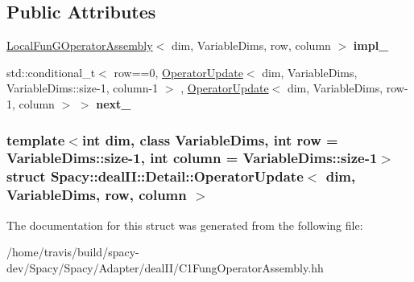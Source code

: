 \subsection*{\-Public \-Attributes}
\begin{DoxyCompactItemize}
\item 
\hypertarget{structSpacy_1_1dealII_1_1Detail_1_1OperatorUpdate_aa7faefd5ccd7c71ef796d42b670297ee}{\hyperlink{structSpacy_1_1dealII_1_1Detail_1_1LocalFunGOperatorAssembly}{\-Local\-Fun\-G\-Operator\-Assembly}$<$ dim, \*
\-Variable\-Dims, row, column $>$ {\bfseries impl\-\_\-}}\label{structSpacy_1_1dealII_1_1Detail_1_1OperatorUpdate_aa7faefd5ccd7c71ef796d42b670297ee}

\item 
\hypertarget{structSpacy_1_1dealII_1_1Detail_1_1OperatorUpdate_a3201840a88fe662079fa05197a0583c9}{std\-::conditional\-\_\-t$<$ row==0, \*
\hyperlink{structSpacy_1_1dealII_1_1Detail_1_1OperatorUpdate}{\-Operator\-Update}$<$ dim, \*
\-Variable\-Dims, \*
\-Variable\-Dims\-::size-\/1, column-\/1 $>$\*
, \hyperlink{structSpacy_1_1dealII_1_1Detail_1_1OperatorUpdate}{\-Operator\-Update}$<$ dim, \*
\-Variable\-Dims, row-\/1, column $>$ $>$ {\bfseries next\-\_\-}}\label{structSpacy_1_1dealII_1_1Detail_1_1OperatorUpdate_a3201840a88fe662079fa05197a0583c9}

\end{DoxyCompactItemize}
\subsubsection*{template$<$int dim, class \-Variable\-Dims, int row = \-Variable\-Dims\-::size-\/1, int column = \-Variable\-Dims\-::size-\/1$>$ struct Spacy\-::deal\-I\-I\-::\-Detail\-::\-Operator\-Update$<$ dim, Variable\-Dims, row, column $>$}



\-The documentation for this struct was generated from the following file\-:\begin{DoxyCompactItemize}
\item 
/home/travis/build/spacy-\/dev/\-Spacy/\-Spacy/\-Adapter/deal\-I\-I/\-C1\-Fung\-Operator\-Assembly.\-hh\end{DoxyCompactItemize}
